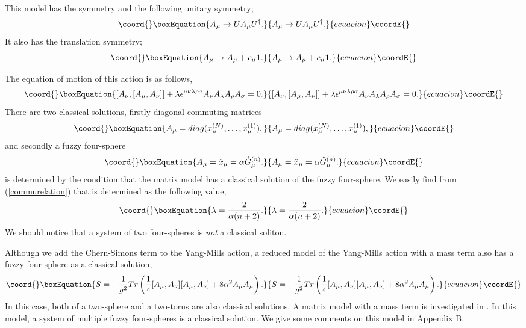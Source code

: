 \documentclass[a4paper,11pt]{article}
\begin{document}
This model has the \coordHE{} symmetry and 
the following unitary symmetry; 
\begin{equation}\coord{}\boxEquation{
A_{\mu} \rightarrow UA_{\mu}U^{\dagger}. 
\label{unitarytr} 
}{
A_{\mu} \rightarrow UA_{\mu}U^{\dagger}. 
}{ecuacion}\coordE{}\end{equation} 
It also has the translation symmetry; 
\begin{equation}\coord{}\boxEquation{
A_{\mu} \rightarrow A_{\mu} + c_{\mu}{\bf 1}.
}{
A_{\mu} \rightarrow A_{\mu} + c_{\mu}{\bf 1}.
}{ecuacion}\coordE{}\end{equation}

The equation of motion of this action is as follows, 
\begin{equation}\coord{}\boxEquation{ 
[A_{\nu},[A_{\mu},A_{\nu}]] 
+\lambda\epsilon^{\mu\nu\lambda\rho\sigma}
A_{\nu}A_{\lambda}A_{\rho}A_{\sigma}=0. 
}{ 
[A_{\nu},[A_{\mu},A_{\nu}]] 
+\lambda\epsilon^{\mu\nu\lambda\rho\sigma}
A_{\nu}A_{\lambda}A_{\rho}A_{\sigma}=0. 
}{ecuacion}\coordE{}\end{equation} 
There are two classical solutions, 
firstly diagonal commuting matrices 
\begin{equation}\coord{}\boxEquation{ 
A_{\mu}=diag(x_{\mu}^{(N)},\ldots,x_{\mu}^{(1)}),  
\label{diagonalsolution}
}{ 
A_{\mu}=diag(x_{\mu}^{(N)},\ldots,x_{\mu}^{(1)}),  
}{ecuacion}\coordE{}\end{equation} 
and secondly a fuzzy four-sphere
\begin{equation}\coord{}\boxEquation{ 
A_{\mu}=\hat{x}_{\mu}=\alpha\hat{G}_{\mu}^{(n)}.
\label{fuzzyfourspheresolution}
}{ 
A_{\mu}=\hat{x}_{\mu}=\alpha\hat{G}_{\mu}^{(n)}.
}{ecuacion}\coordE{}\end{equation} 
\myHighlight{$\lambda$}\coordHE{} is determined by the condition that 
the matrix model has a classical solution of the fuzzy four-sphere.  
We easily find from (\ref{commurelation}) that 
\myHighlight{$\lambda$}\coordHE{} is determined as the following value, 
\begin{equation}\coord{}\boxEquation{ 
\lambda=\frac{2}{\alpha(n+2)}. 
}{ 
\lambda=\frac{2}{\alpha(n+2)}. 
}{ecuacion}\coordE{}\end{equation}
We should notice that  
a system of two four-spheres is {\sl not} a classical soliton.

Although we add the Chern-Simons term to the Yang-Mills action, 
a reduced model of the Yang-Mills action with a mass term also has 
a fuzzy four-sphere as a classical solution, 
\begin{equation}\coord{}\boxEquation{
S=-\frac{1}{g^{2}}Tr\left(
\frac{1}{4}[A_{\mu},A_{\nu}][A_{\mu},A_{\nu}]
+8\alpha^{2}A_{\mu}A_{\mu}
\right). 
}{
S=-\frac{1}{g^{2}}Tr\left(
\frac{1}{4}[A_{\mu},A_{\nu}][A_{\mu},A_{\nu}]
+8\alpha^{2}A_{\mu}A_{\mu}
\right). 
}{ecuacion}\coordE{}\end{equation} 
In this case, 
both of a two-sphere and a two-torus are also classical solutions. 
A matrix model with a mass term is investigated in \cite{yk2}.
In this model, a system of multiple fuzzy four-spheres is a 
classical solution. 
We give some comments on this model in Appendix B. 
\end{document}
